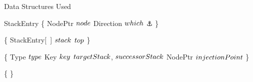 \begin{limitscope}


\begin{algorithm}[tb]
\caption{Data Structures Used} 
\label{algo:local-data|structures}
\DefineKeyWords
\DontPrintSemicolon
\Struct StackEntry \{\;
\PrintSemicolon
\label{lin:local-data|structures:begin}
\label{lin:local-stack|entry:begin}
\Indp 
   NodePtr $node$\;
	 \Enum Direction $which$\;
   \Integer $\anchor$\;
\Indm 
\}\;
\label{lin:local-stack|entry:end}

\BlankLine

\DontPrintSemicolon
\Struct \TraversalRecord{} \{\;
\PrintSemicolon
\label{lin:local-traversal|record:begin}
\Indp 
   StackEntry[~] $stack$\;
	 \Integer $top$\;
\Indm 
\}\;
\label{lin:local-traversal|record:end}

\BlankLine

\DontPrintSemicolon
\Struct \OpRecord{} \{\;
\PrintSemicolon
\label{lin:local-op|record:begin}
\Indp 
   \Enum Type $type$\;
	 Key $key$\;
	 \TraversalRecord{} $targetStack$, $successorStack$\;
	 NodePtr $injectionPoint$\;
	 \BlankLine
\Indm
\}\;
\label{lin:local-op|record:end}

\BlankLine

\DontPrintSemicolon
\Struct \SeekRecord \{\;
\PrintSemicolon
\label{lin:local-seek|record:begin}
\Indp 
\Indm 
\}\;
\label{lin:local-seek|record:end}

\label{lin:local-data|structures:end}
\end{algorithm}




\end{limitscope}
